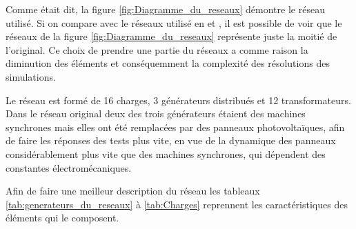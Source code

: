 \newcommand{\trafoi}{40 MVA132/20}
\newcommand{\trafoii}{0.25MVA 20kV/0.4}
\newcommand{\trafoiii}{0.4MVA 20kV/0.4}
\newcommand{\trafoiv}{0.63MVA 20kV/0.4}
\newcommand{\cablei}{ARG7H1RX 185mmq}
\newcommand{\cableii}{ARG7H1RX 70mmq}
\newcommand{\cableiii}{Aerea Cu 70mmq}
Comme était dit, la figure \ref{fig:Diagramme_du_reseaux} démontre le réseau utilisé. Si on compare avec le réseaux utilisé en \cite{cosson:tel-01374469} et \cite{mariani2013controllo}, il est possible de voir que le réseaux de la figure  \ref{fig:Diagramme_du_reseaux} représente juste la moitié de l'original. Ce choix de prendre une partie du réseaux a comme raison la diminution des éléments et conséquemment la complexité des résolutions des simulations.

Le réseau est formé de 16 charges, 3 générateurs distribués et 12 transformateurs.
Dans le réseau original deux des trois générateurs étaient des machines synchrones mais elles ont été remplacées par des panneaux photovoltaïques, afin de faire les réponses des tests plus vite, en vue de la dynamique des panneaux considérablement plus vite que des machines synchrones, qui dépendent des constantes électromécaniques. 

Afin de faire une meilleur description du réseau les tableaux \ref{tab:generateurs_du_reseaux} à \ref{tab:Charges} reprennent les caractéristiques des éléments qui le composent.

